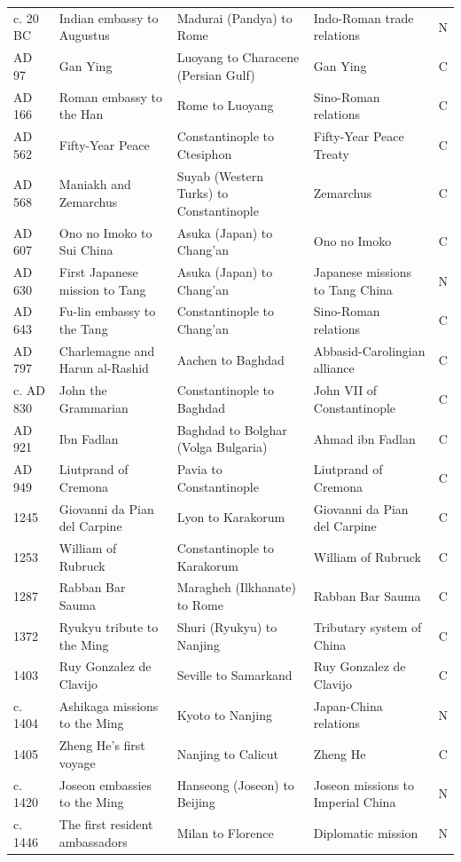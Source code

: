\documentclass[11pt,a4paper]{article}
\begin{document}
{\begin{longtable}{p{1.6cm}p{4.5cm}p{3.7cm}p{3.6cm}c}
c. 20 BC & Indian embassy to Augustus & Madurai (Pandya) to Rome & Indo-Roman trade relations & N\\
AD 97 & Gan Ying & Luoyang to Characene (Persian Gulf) & Gan Ying & C\\
AD 166 & Roman embassy to the Han & Rome to Luoyang & Sino-Roman relations & C\\
AD 562 & Fifty-Year Peace & Constantinople to Ctesiphon & Fifty-Year Peace Treaty & C\\
AD 568 & Maniakh and Zemarchus & Suyab (Western Turks) to Constantinople & Zemarchus & C\\
AD 607 & Ono no Imoko to Sui China & Asuka (Japan) to Chang'an & Ono no Imoko & C\\
AD 630 & First Japanese mission to Tang & Asuka (Japan) to Chang'an & Japanese missions to Tang China & N\\
AD 643 & Fu-lin embassy to the Tang & Constantinople to Chang'an & Sino-Roman relations & C\\
AD 797 & Charlemagne and Harun al-Rashid & Aachen to Baghdad & Abbasid-Carolingian alliance & C\\
c. AD 830 & John the Grammarian & Constantinople to Baghdad & John VII of Constantinople & C\\
AD 921 & Ibn Fadlan & Baghdad to Bolghar (Volga Bulgaria) & Ahmad ibn Fadlan & C\\
AD 949 & Liutprand of Cremona & Pavia to Constantinople & Liutprand of Cremona & C\\
1245 & Giovanni da Pian del Carpine & Lyon to Karakorum & Giovanni da Pian del Carpine & C\\
1253 & William of Rubruck & Constantinople to Karakorum & William of Rubruck & C\\
1287 & Rabban Bar Sauma & Maragheh (Ilkhanate) to Rome & Rabban Bar Sauma & C\\
1372 & Ryukyu tribute to the Ming & Shuri (Ryukyu) to Nanjing & Tributary system of China & C\\
1403 & Ruy Gonzalez de Clavijo & Seville to Samarkand & Ruy Gonzalez de Clavijo & C\\
c. 1404 & Ashikaga missions to the Ming & Kyoto to Nanjing & Japan-China relations & N\\
1405 & Zheng He's first voyage & Nanjing to Calicut & Zheng He & C\\
c. 1420 & Joseon embassies to the Ming & Hanseong (Joseon) to Beijing & Joseon missions to Imperial China & N\\
c. 1446 & The first resident ambassadors & Milan to Florence & Diplomatic mission & N\\

\end{longtable}}
\end{document}
